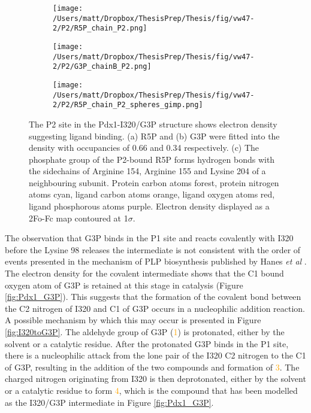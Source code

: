\begin{figure}[!htbp]
\centering
\begin{subfigure}{.3\textwidth}
  \centering
  \texttt{[image: /Users/matt/Dropbox/ThesisPrep/Thesis/fig/vw47-2/P2/R5P\_chain\_P2.png]}
  \caption{}
  \label{fig:P2_R5P}
\end{subfigure}%
\begin{subfigure}{.3\textwidth}
  \centering
  \texttt{[image: /Users/matt/Dropbox/ThesisPrep/Thesis/fig/vw47-2/P2/G3P\_chainB\_P2.png]}
  \caption{}
  \label{fig:P2_G3P}
\end{subfigure}
\begin{subfigure}{.3\textwidth}
  \centering
  \texttt{[image: /Users/matt/Dropbox/ThesisPrep/Thesis/fig/vw47-2/P2/R5P\_chain\_P2\_spheres\_gimp.png]}
  \caption{}
  \label{fig:P2_R5P_bonds}
\end{subfigure}%
\caption[P2 site ligands in the Pdx1 I320/G3P Structure]{The P2 site in the Pdx1-I320/G3P structure shows electron density suggesting ligand binding. (a) R5P and (b) G3P were fitted into the density with occupancies of 0.66 and 0.34 respectively. (c) The phosphate group of the P2-bound R5P forms hydrogen bonds with the sidechains of Arginine 154, Arginine 155 and Lysine 204 of a neighbouring subunit. Protein carbon atoms forest, protein nitrogen atoms cyan, ligand carbon atoms orange, ligand oxygen atoms red, ligand phosphorous atoms purple. Electron density displayed as a 2Fo-Fc map contoured at 1$\sigma$.}
\end{figure}

The observation that G3P binds in the P1 site and reacts covalently with I320 before the Lysine 98 releases the intermediate is not consistent with the order of events presented in the mechanism of PLP biosynthesis published by Hanes \textit{et al} \cite{Hanes2008b}. The electron density for the covalent intermediate shows that the C1 bound oxygen atom of G3P is retained at this stage in catalysis (Figure \ref{fig:Pdx1_G3P}). This suggests that the formation of the covalent bond between the C2 nitrogen of I320 and C1 of G3P occurs in a nucleophilic addition reaction. A possible mechanism by which this may occur is presented in Figure \ref{fig:I320toG3P}. The aldehyde group of G3P (\textcolor{orange}{1}) is protonated, either by the solvent or a catalytic residue. After the protonated G3P binds in the P1 site, there is a nucleophilic attack from the lone pair of the I320 C2 nitrogen to the C1 of G3P, resulting in the addition of the two compounds and formation of \textcolor{orange}{3}. The charged nitrogen originating from I320 is then deprotonated, either by the solvent or a catalytic residue to form \textcolor{orange}{4}, which is the compound that has been modelled as the I320/G3P intermediate in Figure \ref{fig:Pdx1_G3P}.  

